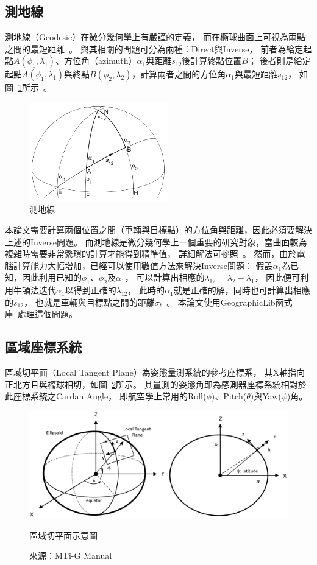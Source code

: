\subsection{測地線}
測地線（Geodesic）在微分幾何學上有嚴謹的定義，
而在橢球曲面上可視為兩點之間的最短距離~\cite{Karney:2013:Algorithms_for_Geodesics}。
與其相關的問題可分為兩種：Direct與Inverse，
前者為給定起點$A(\phi_1,\lambda_1)$、方位角（azimuth）$\alpha_1$與距離$s_{12}$後計算終點位置$B$；
後者則是給定起點$A(\phi_1,\lambda_1)$與終點$B(\phi_2,\lambda_2)$，計算兩者之間的方位角$\alpha_1$與最短距離$s_{12}$，
如圖~\ref{f:geodesic}所示~\cite{Jekeli:2006:GRSinGeodesy}。
\begin{figure}[h!]
	\centering
	\includegraphics[width=6cm]{figures/geodesic}
	\caption{測地線}
	\label{f:geodesic}
\end{figure}

本論文需要計算兩個位置之間（車輛與目標點）的方位角與距離，因此必須要解決上述的Inverse問題。
而測地線是微分幾何學上一個重要的研究對象，當曲面較為複雜時需要非常繁瑣的計算才能得到精準值，
詳細解法可參照~\cite{Karney:2013:Algorithms_for_Geodesics,Jekeli:2006:GRSinGeodesy}。
然而，由於電腦計算能力大幅增加，已經可以使用數值方法來解決Inverse問題：
假設$\alpha_1$為已知，因此利用已知的$\phi_1$、$\phi_2$及$\alpha_1$，
可以計算出相應的$\lambda_{12} = \lambda_2 - \lambda_1$，
因此便可利用牛頓法迭代$\alpha_1$以得到正確的$\lambda_{12}$，
此時的$\alpha_1$就是正確的解，同時也可計算出相應的$s_{12}$，
也就是車輛與目標點之間的距離$\sigma_t$~\cite{Karney:2013:Algorithms_for_Geodesics}。
本論文使用GeographicLib函式庫~\cite{website:GeographicLib}處理這個問題。

\subsection{區域座標系統}
區域切平面（Local Tangent Plane）為姿態量測系統的參考座標系，
其X軸指向正北方且與橢球相切，如圖~\ref{f:LTP}所示。
其量測的姿態角即為感測器座標系統相對於此座標系統之Cardan Angle，
即航空學上常用的Roll($\phi$)、Pitch($\theta$)與Yaw($\psi$)角。
\begin{figure}[h!]
	\centering
	\includegraphics[width=\textwidth]{figures/LTP}
	\caption{區域切平面示意圖}
	\caption*{來源：MTi-G Manual}
	\label{f:LTP}
\end{figure}

